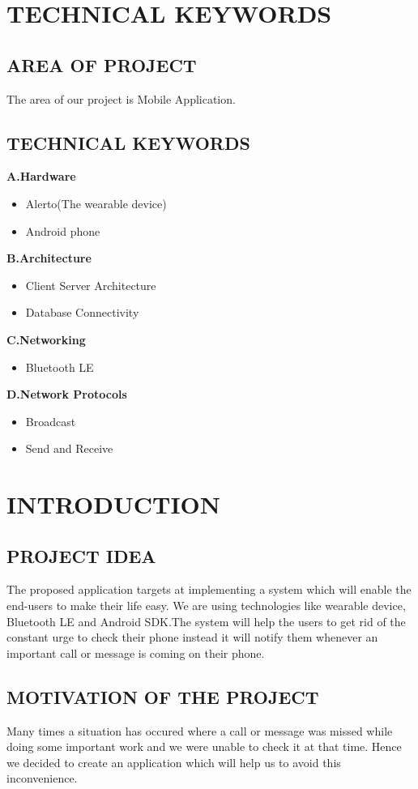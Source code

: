 \documentclass[12pt,a4paper]{report}
\begin{document}
\chapter{\bf{TECHNICAL KEYWORDS}}
\newpage

\section{AREA OF PROJECT}
The area of our project is Mobile Application.
\section{TECHNICAL KEYWORDS}
\textbf{A.Hardware}
\begin{itemize}
	\item Alerto(The wearable device)
	\item Android phone
\end{itemize}
\textbf{B.Architecture}
\begin{itemize}
	\item Client Server Architecture
	\item Database Connectivity
\end{itemize}
\textbf{C.Networking}
\begin{itemize}
	\item Bluetooth LE
\end{itemize}
\textbf{D.Network Protocols}
\begin{itemize}
	\item Broadcast 
	\item Send and Receive
\end{itemize}

\chapter{INTRODUCTION}
\newpage

\section{PROJECT IDEA}
The proposed application targets at implementing a system which will enable the end-users to make their life easy. We are using technologies like wearable device, Bluetooth LE and Android SDK.The system will help the users to get rid of the constant urge to check their phone instead it will notify them whenever an important call or message is coming on their phone.

\section{MOTIVATION OF THE PROJECT}
Many times a situation has occured where a call or message was missed while doing some important work and we were unable to check it at that time. Hence we decided to create an application which will help us to avoid this inconvenience. 
\end{document}
